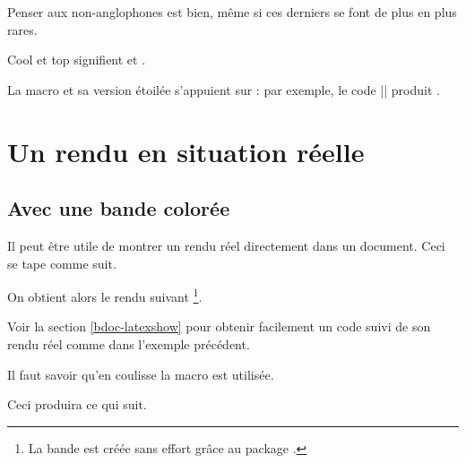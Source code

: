 \documentclass[10pt, a4paper]{article}
\begin{document}
Penser aux non-anglophones est bien, même si ces derniers se font de plus en plus rares.

\begin{bdoclatex}
Cool et top signifient  et .
\end{bdoclatex}


La macro  et sa version étoilée s'appuient sur  : par exemple, le code \bdocinlatex|| produit .


\section{Un rendu en situation réelle} \label{bdoc-showcase}

\subsection{Avec une bande colorée}

\begin{bdocexa}
    Il peut être utile de montrer un rendu réel directement dans un document.
    Ceci se tape comme suit.


    On obtient alors le rendu suivant
    \footnote{
        La bande est créée sans effort grâce au package .
    }.

    \medskip

    
\end{bdocexa}


\begin{bdocrem}
    Voir la section \ref{bdoc-latexshow} pour obtenir facilement un code suivi de son rendu réel comme dans l'exemple précédent.
\end{bdocrem}


\begin{bdocnote}
    Il faut savoir qu'en coulisse la macro  est utilisée.

    \begin{bdoclatex}[std]
    \end{bdoclatex}
\end{bdocnote}




\begin{bdocexa}
    \leavevmode


    Ceci produira ce qui suit.

    \medskip

    
\end{bdocexa}
\end{document}
